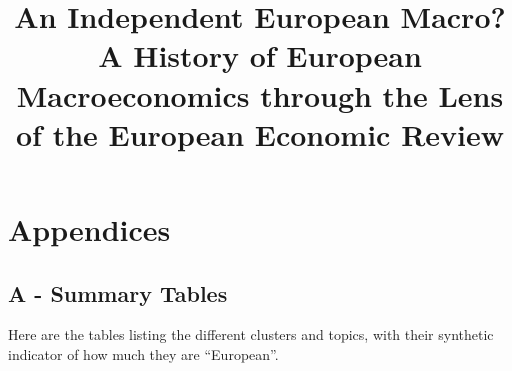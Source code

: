 \documentclass[]{elsarticle} %
\begin{document}
\begin{frontmatter}

  \title{An Independent European Macro? A History of European
Macroeconomics through the Lens of the European Economic Review}
    \author[]{}
  
  
  \begin{abstract}
  
  \end{abstract}
  
 \end{frontmatter}

\newpage

\hypertarget{appendices}{%
\section*{Appendices}\label{appendices}}

\hypertarget{a---summary-tables}{%
\subsection*{A - Summary Tables}\label{a---summary-tables}}

Here are the tables listing the different clusters and topics, with
their synthetic indicator of how much they are ``European''.
\end{document}
